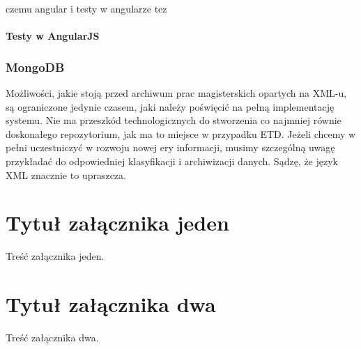 \documentclass[brudnopis]{xmgr}
\begin{document}
czemu angular i testy w angularze tez

\subsubsection{Testy w AngularJS}

\subsection{MongoDB}

\summary
Możliwości, jakie stoją przed archiwum prac magisterskich opartych na
XML-u, są ograniczone jedynie czasem, jaki należy poświęcić na pełną
implementację systemu. Nie ma przeszkód technologicznych do stworzenia
co najmniej równie doskonałego repozytorium, jak ma to miejsce w
przypadku ETD. Jeżeli chcemy w pełni uczestniczyć w rozwoju nowej ery
informacji, musimy szczególną uwagę przykładać do odpowiedniej
klasyfikacji i archiwizacji danych. Sądzę, że język XML znacznie to
upraszcza.

\appendix
\chapter{Tytuł załącznika jeden}

Treść załącznika jeden.

\chapter{Tytuł załącznika dwa}

Treść załącznika dwa.




\listoftables

\listoffigures

\oswiadczenie
\end{document}
